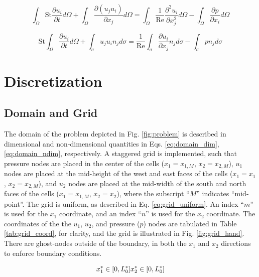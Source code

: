 \documentclass[10pt, letterpaper]{article}
\begin{document}
\begin{equation}
  \int_{\Omega}\text{St}\frac{\partial{u_{i}}}{\partial{t}}d\Omega + \int_{\Omega}\frac{\partial(u_{j}u_{i})}{\partial{x_{j}}}d\Omega = \int_{\Omega}\frac{1}{\text{Re}}\frac{\partial^{2}u_{i}}{\partial{x_{j}^{2}}}d\Omega - \int_{\Omega}\frac{\partial{p}}{\partial{x_{i}}}d\Omega
  \label{eq:mom_ndim_int_0}
\end{equation}

\begin{equation}
  \boxed{\text{St}\int_{\Omega}\frac{\partial{u_{i}}}{\partial{t}}d\Omega + \int_{\sigma}{u_{j}u_{i}n_{j}}d\sigma = \frac{1}{\text{Re}}\int_{\sigma}\frac{\partial{u_{i}}}{\partial{x_{j}}}n_{j}d\sigma - \int_{\sigma}{pn_{j}}d\sigma}
  \label{eq:mom_ndim_int}
\end{equation}

\section{Discretization}

\subsection{Domain and Grid}

The domain of the problem depicted in Fig. \ref{fig:problem} is described in dimensional and non-dimensional quantities in Eqs. \ref{eq:domain_dim}, \ref{eq:domain_ndim}, respectively. A staggered grid is implemented, such that pressure nodes are placed in the center of the cells ($x_{1} = x_{1,M}$, $x_{2} = x_{2,M}$), $u_{1}$ nodes are placed at the mid-height of the west and east faces of the cells ($x_{1} = x_{1}$, $x_{2} = x_{2,M}$), and $u_{2}$ nodes are placed at the mid-width of the south and north faces of the cells ($x_{1} = x_{1,M}$, $x_{2} = x_{2}$), where the subscript ``$M$'' indicates ``mid-point''. The grid is uniform, as described in Eq. \ref{eq:grid_uniform}. An index ``$m$'' is used for the $x_{1}$ coordinate, and an index ``$n$'' is used for the $x_{2}$ coordinate. The coordinates of the the $u_{1}$, $u_{2}$, and pressure ($p$) nodes are tabulated in Table \ref{tab:grid_coord}, for clarity, and the grid is illustrated in Fig. \ref{fig:grid_hand}. There are ghost-nodes outside of the boundary, in both the $x_{1}$ and $x_{2}$ directions to enforce boundary conditions.

\begin{equation}
  x_{1}^{*} \in [0, L_{0}^{*}] \\
  x_{2}^{*} \in [0, L_{0}^{*}] \\
  \label{eq:domain_dim}
\end{equation}
\end{document}
